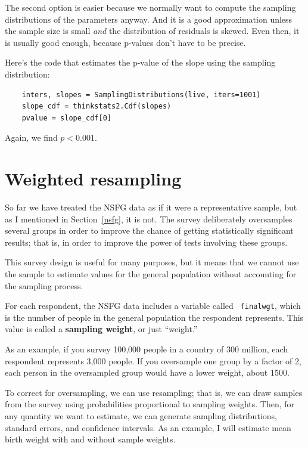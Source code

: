 \documentclass[12pt]{book}
\begin{document}
The second option is easier because we normally want to compute the
sampling distributions of the parameters anyway.  And it is a good
approximation unless the sample size is small {\em and} the
distribution of residuals is skewed.  Even then, it is usually good
enough, because p-values don't have to be precise.

Here's the code that estimates the p-value of the slope using the
sampling distribution:

\begin{verbatim}
    inters, slopes = SamplingDistributions(live, iters=1001)
    slope_cdf = thinkstats2.Cdf(slopes)
    pvalue = slope_cdf[0]
\end{verbatim}

Again, we find $p < 0.001$.  


\section{Weighted resampling}

So far we have treated the NSFG data as if it were a representative
sample, but as I mentioned in Section~\ref{nsfg}, it is not.  The
survey deliberately oversamples several groups in order to
improve the chance of getting statistically significant results; that
is, in order to improve the power of tests involving these groups.

This survey design is useful for many purposes, but it means that we
cannot use the sample to estimate values for the general
population without accounting for the sampling process.

For each respondent, the NSFG data includes a variable called {\tt
  finalwgt}, which is the number of people in the general population
the respondent represents.  This value is called a {\bf sampling
  weight}, or just ``weight.''

As an example, if you survey 100,000 people in a country of 300
million, each respondent represents 3,000 people.  If you oversample
one group by a factor of 2, each person in the oversampled
group would have a lower weight, about 1500.

To correct for oversampling, we can use resampling; that is, we
can draw samples from the survey using probabilities proportional
to sampling weights.  Then, for any quantity we want to estimate, we can
generate sampling distributions, standard errors, and confidence
intervals.  As an example, I will estimate mean birth weight with
and without sample weights.
\end{document}
